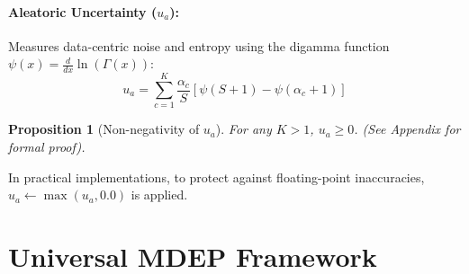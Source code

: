 \documentclass[letterpaper]{article} %
\newtheorem{proposition}{Proposition}
\begin{document}
\paragraph{Aleatoric Uncertainty ($u_a$):} Measures data-centric noise and entropy using the digamma function $\psi(x) = \frac{d}{dx} \ln(\Gamma(x))$:
\begin{equation}\label{eq:u_a}
    u_a = \sum_{c=1}^K \frac{\alpha_c}{S} \left[\psi(S + 1) - \psi(\alpha_c + 1)\right]
\end{equation}
\begin{proposition}[Non-negativity of $u_a$]
For any $K > 1$, $u_a \ge 0$. (See Appendix for formal proof).
\end{proposition}
In practical implementations, to protect against floating-point inaccuracies, $u_a \leftarrow \max(u_a, 0.0)$ is applied.


\section{Universal MDEP Framework}\label{sec:methodology}
\end{document}
